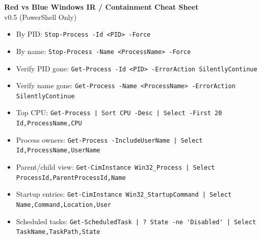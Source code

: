 \documentclass[10pt]{article}
\begin{document}
\color{textmain}

\begin{center}
  {\Large \textbf{Red vs Blue Windows IR / Containment Cheat Sheet}}\\
  \small v0.5 (PowerShell Only)
\end{center}

\begin{tcolorbox}[title=Kill Suspicious Process]
\begin{itemize}[leftmargin=1.1em, itemsep=1pt, topsep=2pt]
  \item By PID: \verb!Stop-Process -Id <PID> -Force!
  \item By name: \verb!Stop-Process -Name <ProcessName> -Force!
  \item Verify PID gone: \verb!Get-Process -Id <PID> -ErrorAction SilentlyContinue!
  \item Verify name gone: \verb!Get-Process -Name <ProcessName> -ErrorAction SilentlyContinue!
\end{itemize}
\end{tcolorbox}

\begin{tcolorbox}[title=Audit Processes + Persistence]
\begin{itemize}[leftmargin=1.1em, itemsep=1pt, topsep=2pt]
  \item Top CPU: \verb!Get-Process | Sort CPU -Desc | Select -First 20 Id,ProcessName,CPU!
  \item Process owners: \verb!Get-Process -IncludeUserName | Select Id,ProcessName,UserName!
  \item Parent/child view: \verb!Get-CimInstance Win32_Process | Select ProcessId,ParentProcessId,Name!
  \item Startup entries: \verb!Get-CimInstance Win32_StartupCommand | Select Name,Command,Location,User!
  \item Scheduled tasks: \verb!Get-ScheduledTask | ? State -ne 'Disabled' | Select TaskName,TaskPath,State!
\end{itemize}
\end{tcolorbox}
\end{document}
